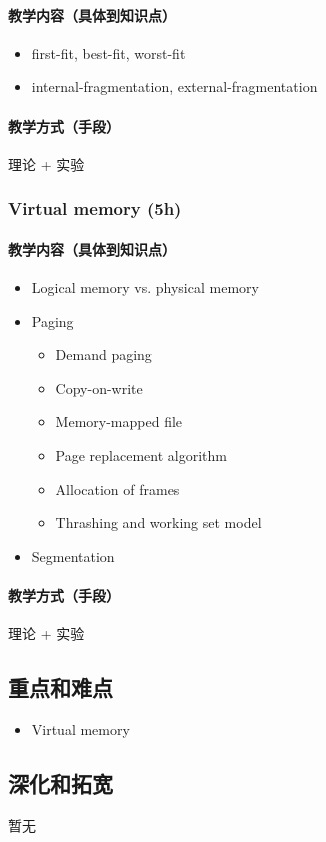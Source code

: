 \documentclass[11pt]{article}
\begin{document}
\paragraph{教学内容（具体到知识点）}
\label{sec-6-2-2-1}
\begin{itemize}
\item first-fit, best-fit, worst-fit
\item internal-fragmentation, external-fragmentation
\end{itemize}
\paragraph{教学方式（手段）}
\label{sec-6-2-2-2}
理论 + 实验
\subsubsection{Virtual memory (5h)}
\label{sec-6-2-3}
\paragraph{教学内容（具体到知识点）}
\label{sec-6-2-3-1}
\begin{itemize}
\item Logical memory vs. physical memory
\item Paging
\begin{itemize}
\item Demand paging
\item Copy-on-write
\item Memory-mapped file
\item Page replacement algorithm
\item Allocation of frames
\item Thrashing and working set model
\end{itemize}
\item Segmentation
\end{itemize}
\paragraph{教学方式（手段）}
\label{sec-6-2-3-2}
理论 + 实验
\subsection{重点和难点}
\label{sec-6-3}
\begin{itemize}
\item Virtual memory
\end{itemize}
\subsection{深化和拓宽}
\label{sec-6-4}
暂无
\end{document}
